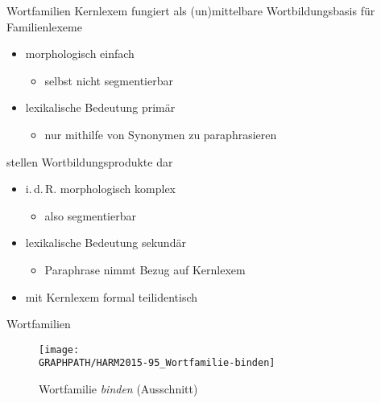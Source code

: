 \begin{frame}{Wortfamilien}
\onslide<+->
\alert{Kernlexem} fungiert als (un)mittelbare Wortbildungsbasis für Familienlexeme
\Halbzeile
\begin{itemize}[<+->]
	\item		morphologisch einfach
		\begin{itemize}
			\item		 selbst nicht segmentierbar
		\end{itemize}
	\item		lexikalische Bedeutung primär
	\begin{itemize}
		\item		nur mithilfe von Synonymen zu paraphrasieren
	\end{itemize}
\end{itemize}
\onslide<+->
\Zeile
{} stellen Wortbildungsprodukte dar
\Halbzeile
\begin{itemize}[<+->]
	\item		 i.\,d.\,R. morphologisch komplex
		\begin{itemize}
			\item		also segmentierbar
		\end{itemize}
	\item		lexikalische Bedeutung sekundär
		\begin{itemize}
			\item		Paraphrase nimmt Bezug auf Kernlexem
		\end{itemize}
	\item		mit Kernlexem formal teilidentisch
\end{itemize}
\end{frame}

\begin{frame}{Wortfamilien}
\center
\begin{figure}
\texttt{[image: \\GRAPHPATH/HARM2015-95\_Wortfamilie-binden]}
\caption{Wortfamilie \textit{binden} (Ausschnitt) \citep[ex][95]{Harm2015}}
\end{figure}
\end{frame}


